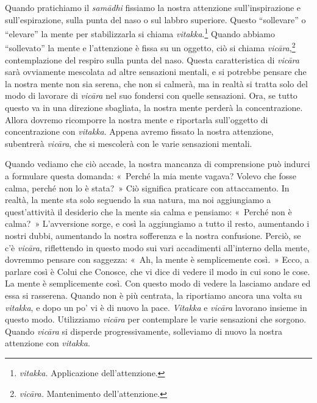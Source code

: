 Quando pratichiamo il \emph{samādhi} fissiamo la nostra attenzione
sull'inspirazione e sull'espirazione, sulla punta del naso o sul labbro
superiore. Questo ``sollevare'' o ``elevare'' la mente per stabilizzarla
si chiama \emph{vitakka}.\footnote{\emph{vitakka.} Applicazione
  dell'attenzione.} Quando abbiamo ``sollevato'' la mente e l'attenzione
è fissa su un oggetto, ciò si chiama \emph{vicāra},\footnote{\emph{vicāra.}
  Mantenimento dell'attenzione.} contemplazione del respiro sulla punta
del naso. Questa caratteristica di \emph{vicāra} sarà ovviamente
mescolata ad altre sensazioni mentali, e si potrebbe pensare che la
nostra mente non sia serena, che non si calmerà, ma in realtà si tratta
solo del modo di lavorare di \emph{vicāra} nel suo fondersi con quelle
sensazioni. Ora, se tutto questo va in una direzione sbagliata, la
nostra mente perderà la concentrazione. Allora dovremo ricomporre la
nostra mente e riportarla sull'oggetto di concentrazione con
\emph{vitakka}. Appena avremo fissato la nostra attenzione, subentrerà
\emph{vicāra}, che si mescolerà con le varie sensazioni mentali.

Quando vediamo che ciò accade, la nostra mancanza di comprensione può
indurci a formulare questa domanda: «~Perché la mia mente vagava? Volevo
che fosse calma, perché non lo è stata?~» Ciò significa praticare con
attaccamento. In realtà, la mente sta solo seguendo la sua natura, ma
noi aggiungiamo a quest'attività il desiderio che la mente sia calma e
pensiamo: «~Perché non è calma?~» L'avversione sorge, e così la
aggiungiamo a tutto il resto, aumentando i nostri dubbi, aumentando la
nostra sofferenza e la nostra confusione. Perciò, se c'è \emph{vicāra},
riflettendo in questo modo sui vari accadimenti all'interno della mente,
dovremmo pensare con saggezza: «~Ah, la mente è semplicemente così.~»
Ecco, a parlare così è Colui che Conosce, che vi dice di vedere il modo
in cui sono le cose. La mente è semplicemente così. Con questo modo di
vedere la lasciamo andare ed essa si rasserena. Quando non è più
centrata, la riportiamo ancora una volta su \emph{vitakka}, e dopo un
po' vi è di nuovo la pace. \emph{Vitakka} e \emph{vicāra} lavorano
insieme in questo modo. Utilizziamo \emph{vicāra} per contemplare le
varie sensazioni che sorgono. Quando \emph{vicāra} si disperde
progressivamente, solleviamo di nuovo la nostra attenzione con
\emph{vitakka}.

